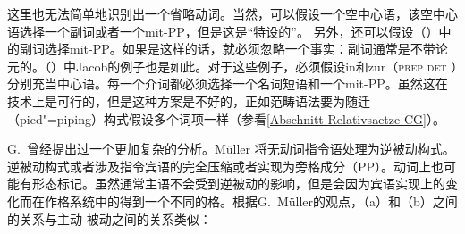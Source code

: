 \begin{exe}
\begin{xlist}[iv.]
\begin{exe}
\begin{xlist}[iv.]
\zl
这里也无法简单地识别出一个省略动词。当然，可以假设一个空中心语，该空中心语选择一个副词或者一个mit-PP，但是这是“特设的”。
另外，还可以假设（）中的副词选择mit-PP。如果是这样的话，就必须忽略一个事实：副词通常是不带论元的。（）中Jacob的例子也是如此。对于这些例子，必须假设in和zur（\textsc{prep} \textsc{det} ）分别充当中心语。每一个介词都必须选择一个名词短语和一个mit-PP。虽然这在技术上是可行的，但是这种方案是不好的，正如范畴语法要为随迁（pied"=piping）构式假设多个词项一样（参看\ref{Abschnitt-Relativsaetze-CG}）。

G.\ \citet{GMueller2009a}曾经提出过一个更加复杂的分析。Müller 将无动词指令语处理为逆被动构式。逆被动构式或者涉及指令宾语的完全压缩或者实现为旁格成分（PP）。动词上也可能有形态标记。虽然通常主语不会受到逆被动的影响，但是会因为宾语实现上的变化而在作格系统中的得到一个不同的格。根据G.\ Müller的观点，（a）和（b）之间的关系与主动-被动之间的关系类似：


\end{xlist}
\end{exe}
\end{xlist}
\end{exe}
